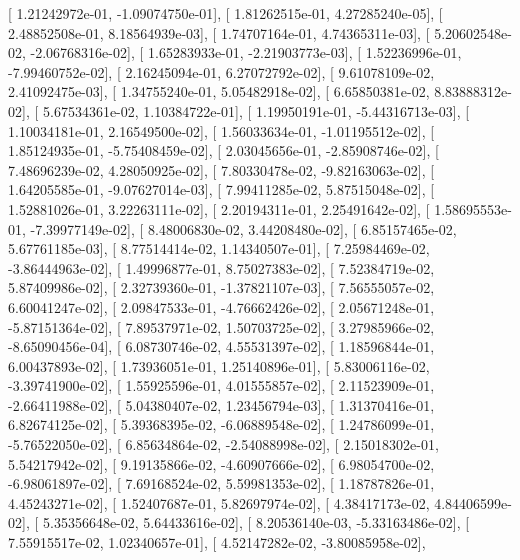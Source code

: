 \documentclass{article}
\begin{document}
       [  1.21242972e-01,  -1.09074750e-01],
       [  1.81262515e-01,   4.27285240e-05],
       [  2.48852508e-01,   8.18564939e-03],
       [  1.74707164e-01,   4.74365311e-03],
       [  5.20602548e-02,  -2.06768316e-02],
       [  1.65283933e-01,  -2.21903773e-03],
       [  1.52236996e-01,  -7.99460752e-02],
       [  2.16245094e-01,   6.27072792e-02],
       [  9.61078109e-02,   2.41092475e-03],
       [  1.34755240e-01,   5.05482918e-02],
       [  6.65850381e-02,   8.83888312e-02],
       [  5.67534361e-02,   1.10384722e-01],
       [  1.19950191e-01,  -5.44316713e-03],
       [  1.10034181e-01,   2.16549500e-02],
       [  1.56033634e-01,  -1.01195512e-02],
       [  1.85124935e-01,  -5.75408459e-02],
       [  2.03045656e-01,  -2.85908746e-02],
       [  7.48696239e-02,   4.28050925e-02],
       [  7.80330478e-02,  -9.82163063e-02],
       [  1.64205585e-01,  -9.07627014e-03],
       [  7.99411285e-02,   5.87515048e-02],
       [  1.52881026e-01,   3.22263111e-02],
       [  2.20194311e-01,   2.25491642e-02],
       [  1.58695553e-01,  -7.39977149e-02],
       [  8.48006830e-02,   3.44208480e-02],
       [  6.85157465e-02,   5.67761185e-03],
       [  8.77514414e-02,   1.14340507e-01],
       [  7.25984469e-02,  -3.86444963e-02],
       [  1.49996877e-01,   8.75027383e-02],
       [  7.52384719e-02,   5.87409986e-02],
       [  2.32739360e-01,  -1.37821107e-03],
       [  7.56555057e-02,   6.60041247e-02],
       [  2.09847533e-01,  -4.76662426e-02],
       [  2.05671248e-01,  -5.87151364e-02],
       [  7.89537971e-02,   1.50703725e-02],
       [  3.27985966e-02,  -8.65090456e-04],
       [  6.08730746e-02,   4.55531397e-02],
       [  1.18596844e-01,   6.00437893e-02],
       [  1.73936051e-01,   1.25140896e-01],
       [  5.83006116e-02,  -3.39741900e-02],
       [  1.55925596e-01,   4.01555857e-02],
       [  2.11523909e-01,  -2.66411988e-02],
       [  5.04380407e-02,   1.23456794e-03],
       [  1.31370416e-01,   6.82674125e-02],
       [  5.39368395e-02,  -6.06889548e-02],
       [  1.24786099e-01,  -5.76522050e-02],
       [  6.85634864e-02,  -2.54088998e-02],
       [  2.15018302e-01,   5.54217942e-02],
       [  9.19135866e-02,  -4.60907666e-02],
       [  6.98054700e-02,  -6.98061897e-02],
       [  7.69168524e-02,   5.59981353e-02],
       [  1.18787826e-01,   4.45243271e-02],
       [  1.52407687e-01,   5.82697974e-02],
       [  4.38417173e-02,   4.84406599e-02],
       [  5.35356648e-02,   5.64433616e-02],
       [  8.20536140e-03,  -5.33163486e-02],
       [  7.55915517e-02,   1.02340657e-01],
       [  4.52147282e-02,  -3.80085958e-02],
\end{document}
